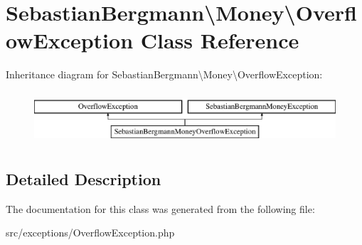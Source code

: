 \hypertarget{classSebastianBergmann_1_1Money_1_1OverflowException}{}\section{Sebastian\+Bergmann\textbackslash{}Money\textbackslash{}Overflow\+Exception Class Reference}
\label{classSebastianBergmann_1_1Money_1_1OverflowException}
Inheritance diagram for Sebastian\+Bergmann\textbackslash{}Money\textbackslash{}Overflow\+Exception\+:\begin{figure}[H]
\begin{center}
\leavevmode
\includegraphics[height=1.958042cm]{classSebastianBergmann_1_1Money_1_1OverflowException}
\end{center}
\end{figure}


\subsection{Detailed Description}


The documentation for this class was generated from the following file\+:\begin{DoxyCompactItemize}
\item 
src/exceptions/Overflow\+Exception.\+php\end{DoxyCompactItemize}
